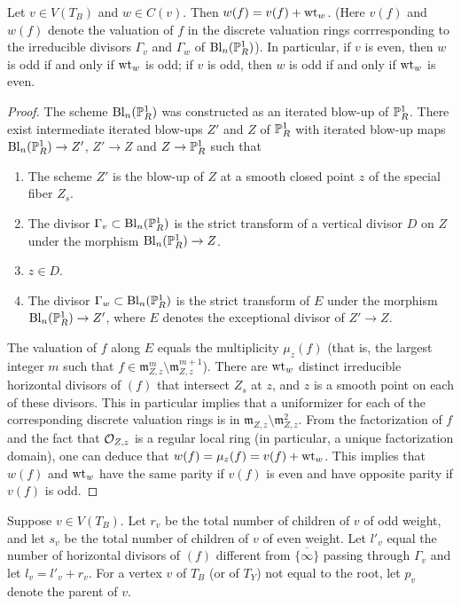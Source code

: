 \begin{lemma}\label{oddeven}
 Let $v \in V(T_B)$ and $w \in C(v)$. Then $w(f) = v(f) + \wt_w$. (Here $v(f)$ and $w(f)$ denote the valuation of $f$ in the discrete valuation rings corrresponding to the irreducible divisors $\Gamma_v$ and $\Gamma_{w}$ of $\mathrm{Bl}_n(\P^1_R)$). In particular, if $v$ is even, then $w$ is odd if and only if $\wt_w$ is odd; if $v$ is odd, then $w$ is odd if and only if $\wt_w$ is even. 
\end{lemma}
\begin{proof}
The scheme $\mathrm{Bl}_n(\P^1_R)$ was constructed as an iterated blow-up of $\P^1_R$. There exist intermediate iterated blow-ups $Z'$ and $Z$ of $\P^1_R$ with iterated blow-up maps $\mathrm{Bl}_n(\P^1_R) \rightarrow Z'$, $Z' \rightarrow Z$ and $Z \rightarrow \P^1_R$ such that 
\begin{enumerate}[\upshape (a)]
 \item The scheme $Z'$ is the blow-up of $Z$ at a smooth closed point $z$ of the special fiber $Z_s$. 
 \item The divisor $\Gamma_v \subset \mathrm{Bl}_n(\P^1_R)$ is the strict transform of a vertical divisor $D$ on $Z$ under the morphism $\mathrm{Bl}_n(\P^1_R) \rightarrow Z$. 
 \item $z \in D$.
 \item The divisor $\Gamma_{w} \subset \mathrm{Bl}_n(\P^1_R)$ is the strict transform of $E$ under the morphism $\mathrm{Bl}_n(\P^1_R) \rightarrow Z'$, where $E$ denotes the exceptional divisor of $Z' \rightarrow Z$.
\end{enumerate}
The valuation of $f$ along $E$ equals the multiplicity $\mu_z(f)$ (that is, the largest integer $m$ such that $f \in \mathfrak{m}_{Z,z}^m \setminus \mathfrak{m}_{Z,z}^{m+1}$). There are $\wt_w$ distinct irreducible horizontal divisors of $(f)$ that intersect $Z_s$ at $z$, and $z$ is a smooth point on each of these divisors. This in particular implies that a uniformizer for each of the corresponding discrete valuation rings is in $\mathfrak{m}_{Z,z} \setminus \mathfrak{m}_{Z,z}^2$. From the factorization of $f$ and the fact that $\O_{Z,z}$ is a regular local ring (in particular, a unique factorization domain), one can deduce that $w(f) = \mu_z(f) = v(f) + \wt_w$. This implies that $w(f)$ and $\wt_w$ have the same parity if $v(f)$ is even and have opposite parity if $v(f)$ is odd.
\end{proof}

\begin{defn}\label{lrv}
\textup{Suppose $v \in V(T_B)$. Let $r_v$ be the total number of children of $v$ of odd weight, and let $s_v$ be the total number of children of $v$ of even weight. Let $l'_v$ equal the number of horizontal divisors of $(f)$ different from $\overline{\{ \infty \}}$ passing through $\Gamma_v$ and let $l_v = l'_v+r_v$. For a vertex $v$ of $T_B$ (or of $T_Y$) not equal to the root, let $p_v$ denote the parent of $v$.}  
\end{defn}

